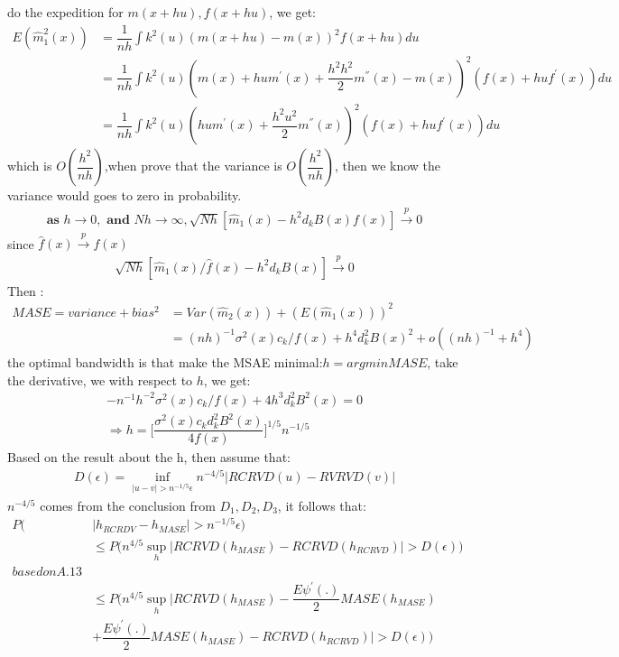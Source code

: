 \documentclass[12pt]{amsart}
\begin{document}
do the expedition for $m(x+hu),f(x+hu)$, we get:
\begin{align}
E(\hat{m}^{2}_{1}(x))&=\dfrac{1}{nh}\int k^{2}(u)(m(x+hu)-m(x))^{2}f(x+hu)du\nonumber\\
&=\dfrac{1}{nh}\int k^{2}(u)(m(x)+hum^{'}(x)+\dfrac{h^{2}h^{2}}{2}m^{''}(x)-m(x))^{2}(f(x)+huf^{'}(x))du\nonumber\\
&=\dfrac{1}{nh}\int k^{2}(u)(hum^{'}(x)+\dfrac{h^{2}u^{2}}{2}m^{''}(x))^{2}(f(x)+huf^{'}(x))du\nonumber
\end{align} 
which is $O(\dfrac{h^{2}}{nh})$,when prove that the variance is $O(\dfrac{h^2}{nh})$, then we know the variance would goes to zero in probability.
\begin{align}
\textbf{as } h \longrightarrow 0, \textbf{ and } Nh \longrightarrow \infty , \sqrt{Nh}[\hat{m}_{1}(x)-h^{2}d_{k}B(x)f(x)] \xrightarrow{p} 0
\end{align}
since $\hat{f}(x) \xrightarrow{p} f(x)$
\begin{align}
\sqrt{Nh}[\hat{m}_{1}(x)/\hat{f}(x)-h^{2}d_{k}B(x)] \xrightarrow{p} 0
\end{align}
Then :
\begin{align}
MASE=variance+bias^2&=Var(\hat{m}_{2}(x))+(E(\hat{m}_{1}(x)))^{2}\nonumber\\
&=(nh)^{-1}\sigma^{2}(x)c_{k}/f(x)+h^{4}d^{2}_{k}B(x)^2+o((nh)^{-1}+h^{4})
\end{align}
the optimal bandwidth is that make the MSAE minimal:$h=arg min MASE$, take the derivative, we with respect to $h$, we get:
\begin{align}
-n^{-1}h^{-2}\sigma^{2}(x)c_{k}/f(x)+4h^{3}d^{2}_{k}B^{2}(x)=0\nonumber\\
\Rightarrow h=\bigg[\dfrac{\sigma^{2}(x)c_{k}d^{2}_{k}B^{2}(x)}{4f(x)}\bigg]^{1/5}n^{-1/5}
\end{align}
Based on the result about the h, then assume that:
\begin{align}
D(\epsilon)=\inf_{|u-v|>n^{-1/5}\epsilon}n^{-4/5}|RCRVD(u)-RVRVD(v)|
\end{align}
$n^{-4/5}$ comes from the conclusion from $D_{1},D_{2},D_{3}$, it follows that:
\begin{align}
P(&|h_{RCRDV}-h_{MASE}|>n^{-1/5}\epsilon)\\
&\leq P\bigg(n^{4/5}\sup_{h}|RCRVD(h_{MASE})-RCRVD(h_{RCRVD})|>D(\epsilon)\bigg)\nonumber\\
based on A.13 \nonumber\\
&\leq P\bigg(n^{4/5}\sup_{h}\bigg|RCRVD(h_{MASE})-\dfrac{E\psi^{'}(.)}{2}MASE(h_{MASE})\nonumber\\
&+\dfrac{E\psi^{'}(.)}{2}MASE(h_{MASE})-RCRVD(h_{RCRVD})\bigg|>D(\epsilon)\bigg)
\end{align}
\end{document}

